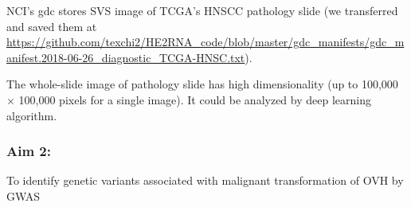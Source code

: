 \documentclass[12pt, a4paper]{article}
\begin{document}

NCI's \acrfull{gdc} stores SVS image of TCGA's HNSCC pathology slide (we transferred and saved them at \url{https://github.com/texchi2/HE2RNA_code/blob/master/gdc_manifests/gdc_manifest.2018-06-26_diagnostic_TCGA-HNSC.txt}).



The whole-slide image of pathology slide has high dimensionality (up to 100,000 × 100,000 pixels for a single image). It could be analyzed by deep learning algorithm.



\clearpage

\subsubsection*{Aim 2:}
To identify genetic variants associated with malignant transformation
of OVH by GWAS\\[0.5cm]

\end{document}
